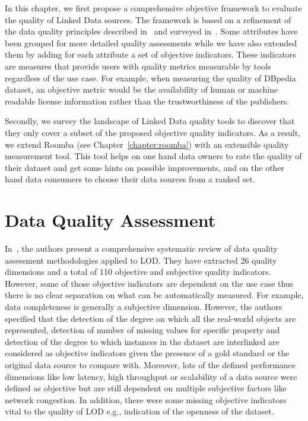 In this chapter, we first propose a comprehensive objective framework to evaluate the quality of Linked Data sources. The framework is based on a refinement of the data quality principles described in~\cite{Assaf:DQMST:12} and surveyed in~\cite{Zaveri:SemWebJorunal:12}. Some attributes have been grouped for more detailed quality assessments while we have also extended them by adding for each attribute a set of objective indicators. These indicators are measures that provide users with quality metrics measurable by tools regardless of the use case. For example, when measuring the quality of DBpedia dataset, an objective metric would be the availability of human or machine readable license information rather than the trustworthiness of the publishers.

Secondly, we survey the landscape of Linked Data quality tools to discover that they only cover a subset of the proposed objective quality indicators. As a result, we extend Roomba (see Chapter~\ref{chapter:roomba}) with an extensible quality measurement tool. This tool helps on one hand data owners to rate the quality of their dataset and get some hints on possible improvements, and on the other hand data consumers to choose their data sources from a ranked set.


\section{Data Quality Assessment}
\label{section:data-quality-assessment}
In~\cite{Zaveri:SemWebJorunal:12}, the authors present a comprehensive systematic review of data quality assessment methodologies applied to LOD. They have extracted 26 quality dimensions and a total of 110 objective and subjective quality indicators. However, some of those objective indicators are dependent on the use case thus there is no clear separation on what can be automatically measured. For example, data completeness is generally a subjective dimension. However, the authors specified that the detection of the degree on which all the real-world objects are represented, detection of number of missing values for specific property and detection of the degree to which instances in the dataset are interlinked are considered as objective indicators given the presence of a gold standard or the original data source to compare with. Moreover, lots of the defined performance dimensions like low latency, high throughput or scalability of a data source were defined as objective but are still dependent on multiple subjective factors like network congestion. In addition, there were some missing objective indicators vital to the quality of LOD e.g., indication of the openness of the dataset.

